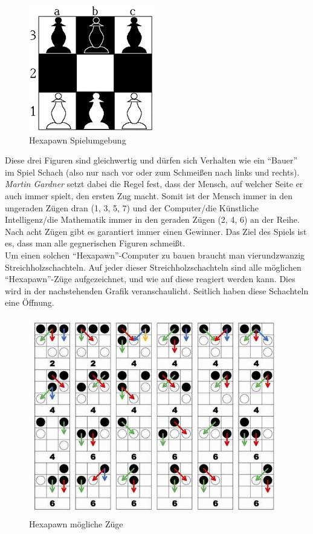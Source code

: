 \begin{figure}[H]
    \centering
    \includegraphics[scale=1]{pics/hexapawn/hexapawn_setup.png}
    \caption{Hexapawn Spielumgebung \cite{tech:hexapawnsetup:cite}}
    \label{fig:tech:HexapawnSetup}
\end{figure}

Diese drei Figuren sind gleichwertig und dürfen sich Verhalten wie ein ``Bauer'' im Spiel Schach (also nur nach vor oder zum Schmeißen nach links und rechts). \textit{Martin Gardner} setzt dabei die Regel fest, dass der Mensch, auf welcher Seite er auch immer spielt, den ersten Zug macht. Somit ist der Mensch immer in den ungeraden Zügen dran (1, 3, 5, 7) und der Computer/die Künstliche Intelligenz/die Mathematik immer in den geraden Zügen (2, 4, 6) an der Reihe. Nach acht Zügen gibt es garantiert immer einen Gewinner. Das Ziel des Spiels ist es, dass man alle gegnerischen Figuren schmeißt.
\\
Um einen solchen ``Hexapawn''-Computer zu bauen braucht man vierundzwanzig Streichholzschachteln. Auf jeder dieser Streichholzschachteln sind alle möglichen ``Hexapawn''-Züge aufgezeichnet, und wie auf diese reagiert werden kann. Dies wird in der nachstehenden Grafik veranschaulicht. Seitlich haben diese Schachteln eine Öffnung.


\begin{figure}[H]
    \centering
    \includegraphics[scale=1]{pics/hexapawn/hexapawn_zuege.jpg}
    \caption{Hexapawn mögliche Züge \cite{tech:hexapawn:cite}}
    \label{fig:tech:HexapawnZuege}
\end{figure}


